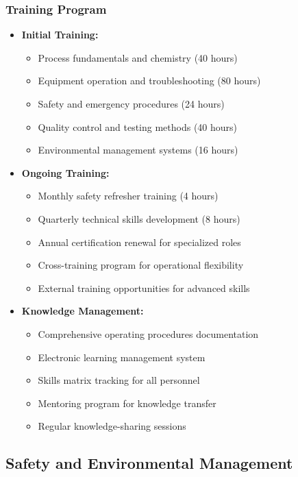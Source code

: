 \subsubsection{Training Program}
\begin{itemize}
    \item \textbf{Initial Training:}
    \begin{itemize}
        \item Process fundamentals and chemistry (40 hours)
        \item Equipment operation and troubleshooting (80 hours)
        \item Safety and emergency procedures (24 hours)
        \item Quality control and testing methods (40 hours)
        \item Environmental management systems (16 hours)
    \end{itemize}
    
    \item \textbf{Ongoing Training:}
    \begin{itemize}
        \item Monthly safety refresher training (4 hours)
        \item Quarterly technical skills development (8 hours)
        \item Annual certification renewal for specialized roles
        \item Cross-training program for operational flexibility
        \item External training opportunities for advanced skills
    \end{itemize}
    
    \item \textbf{Knowledge Management:}
    \begin{itemize}
        \item Comprehensive operating procedures documentation
        \item Electronic learning management system
        \item Skills matrix tracking for all personnel
        \item Mentoring program for knowledge transfer
        \item Regular knowledge-sharing sessions
    \end{itemize}
\end{itemize}

\subsection{Safety and Environmental Management}

